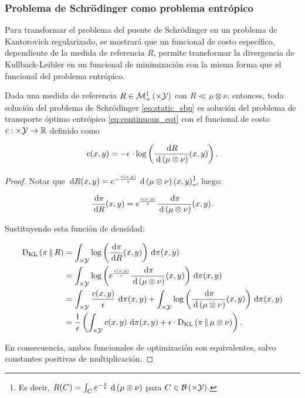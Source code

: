 \subsubsection{Problema de Schrödinger como problema entrópico}

Para transformar el problema del puente de Schrödinger en un problema de Kantorovich regularizado, se mostrará que un funcional de costo específico, dependiente de la medida de referencia $R$, permite transformar la divergencia de Kullback-Leibler en un funcional de minimización con la misma forma que el funcional del problema entrópico.

\begin{prop}
	Dada una medida de referencia $R\in\probmeasure{\xspace\times\yspace}$ con $R\ll\mu\otimes\nu$, entonces, toda solución del problema de Schrödinger \eqref{eq:static_sbp} es solución del problema de transporte óptimo entrópico \eqref{eq:continuous_eot} con el funcional de costo $c:\times\mathcal{Y}\to\mathbb{R}$ definido como

	\begin{equation*}
		c(x,y)=-\epsilon\cdot\log\left(\frac{\,\operatorname{d}\! R}{\,\operatorname{d}\!\,\left(\mu\otimes\nu\right)}(x,y)\right).
	\end{equation*}
\end{prop}

\begin{proof}
	Notar que $\,\operatorname{d}\! R(x,y) = e^{-\frac{c(x,y)}{\epsilon}}\,\operatorname{d}\!\,\left(\mu\otimes\nu\right)(x,y)$\footnote{Es decir, $R(C)=\int_{C} e^{-\frac{c}{\epsilon}}\,\operatorname{d}\!\,\left(\mu\otimes\nu\right)$ para $C\in\borel{\xspace\times\yspace}$.}, luego:

	\begin{equation*}
		\frac{\,\operatorname{d}\!\pi}{\,\operatorname{d}\! R}(x,y) = e^{\frac{c(x,y)}{\epsilon}} \frac{\,\operatorname{d}\!\pi}{\,\operatorname{d}\!\,\left(\mu\otimes\nu\right)}(x,y) .
	\end{equation*}

	Sustituyendo esta función de densidad:

	\begin{align*}
		\KL{\pi}{R} &= \int_{\xspace\times\yspace} \log\parent{\frac{\d\pi}{\d R}(x,y)} \d\pi(x,y)\\
		&= \int_{\xspace\times\yspace} \log\parent{e^{\frac{c(x,y)}{\epsilon}}\frac{\d\pi}{\d\,\parent{\mu\otimes\nu}}(x,y)} \d\pi(x,y)\\
		&= \int_{\xspace\times\yspace} \frac{c(x,y)}{\epsilon} \d\pi(x,y) + \int_{\xspace\times\yspace} \log\parent{\frac{\d\pi}{\d\,\parent{\mu\otimes\nu}}(x,y)} \d\pi(x,y)\\
		&= \frac{1}{\epsilon}\parent{\int_{\xspace\times\yspace} c(x,y) \d\pi(x,y) + \epsilon\cdot\KL{\pi}{\mu\otimes\nu}}.
	\end{align*}

	En consecuencia, ambos funcionales de optimización son equivalentes, salvo constantes positivas de multiplicación.

\end{proof}

